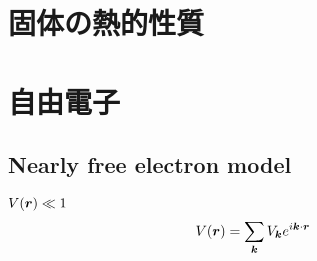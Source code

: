\documentclass[uplatex,dvipdfmx,a4paper,11pt]{jlreq}
\begin{document}
\section{固体の熱的性質}
\subsection{}

\section{自由電子}
\subsection{Nearly free electron model}
$V(\bm{r}) \ll 1$
\begin{align}
  V(\bm{r}) & = \sum_{\bm{k}}V_{\bm{k}}e^{i\bm{k}\cdot\bm{r}}
\end{align}
\end{document}
